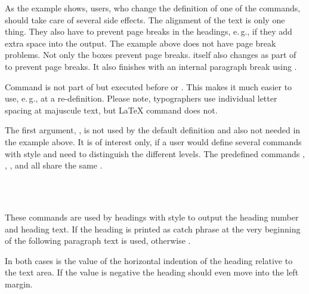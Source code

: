 As the example shows, users, who change the definition of one of the commands,
should take care of several side effects. The alignment of the text is only
one thing. They also have to prevent page breaks in the headings, e.\,g., if
they add extra space into the output. The example above does not have page
break problems. Not only the boxes prevent page breaks. \KOMAScript{} itself
also changes  as part of  to prevent page
breaks. It also finishes  with an internal paragraph break using
.

Command  is not part of  but executed before
 or . This makes
it much easier to use, e.\,g.,  at a
re-definition. Please note, typographers use individual letter spacing at
majuscule text, but \LaTeX{} command  does not.

The first argument, , is not used by the default definition and
also not needed in the example above. It is of interest only, if a user would
define several commands with  style and need to distinguish
the different levels. The predefined commands ,
, , and  all share the same
 .%
%
%


\begin{Declaration}
    \\
    \\
\end{Declaration}
%
%
These commands are used by headings with style 
to output the heading number and heading text. If the heading is printed as
catch phrase at the very beginning of the following paragraph text
 is used, otherwise
.

In both cases  is the value of the horizontal indention of the
heading relative to the text area. If the value is negative the heading should
even move into the left margin.

